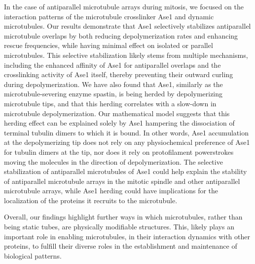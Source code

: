 In the case of antiparallel microtubule arrays during mitosis, we focused on the interaction patterns of the microtubule crosslinker Ase1 and dynamic microtubules. Our results demonstrate that Ase1 selectively stabilizes antiparallel microtubule overlaps by both reducing depolymerization rates and enhancing rescue frequencies, while having minimal effect on isolated or parallel microtubules. This selective stabilization likely stems from multiple mechanisms, including the enhanced affinity of Ase1 for antiparallel overlaps and the crosslinking activity of Ase1 itself, thereby preventing their outward curling during depolymerization. We have also found that Ase1, similarly as the microtubule-severing enzyme spastin, is being herded by depolymerizing microtubule tips, and that this herding correlates with a slow-down in microtubule depolymerization. Our mathematical model suggests that this herding effect can be explained solely by Ase1 hampering the dissociation of terminal tubulin dimers to which it is bound. In other words, Ase1 accumulation at the depolymerizing tip does not rely on any physiochemical preference of Ase1 for tubulin dimers at the tip, nor does it rely on protofilament powerstrokes moving the molecules in the direction of depolymerization. The selective stabilization of antiparallel microtubules of Ase1 could help explain the stability of antiparallel microtubule arrays in the mitotic spindle and other antiparallel microtubule arrays, while Ase1 herding could have implications for the localization of the proteins it recruits to the microtubule.\par

Overall, our findings highlight further ways in which microtubules, rather than being static tubes, are physically modifiable structures. This, likely plays an important role in enabling microtubules, in their interaction dynamics with other proteins, to fulfill their diverse roles in the establishment and maintenance of biological patterns.